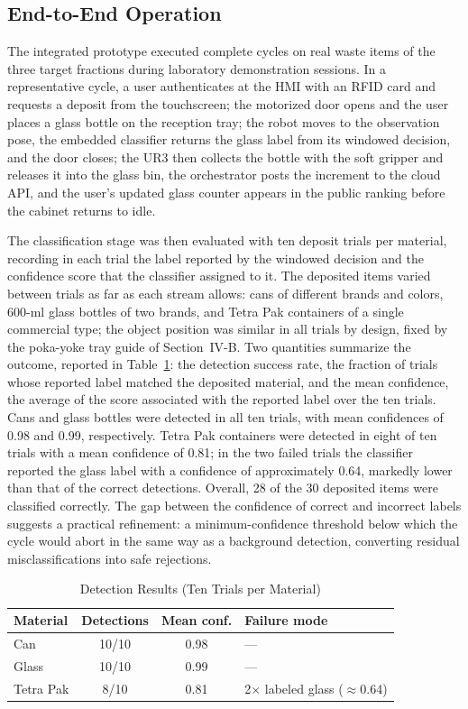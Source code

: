 \documentclass[conference]{IEEEtran}
\begin{document}
\subsection{End-to-End Operation}
The integrated prototype executed complete cycles on real waste items of the three target fractions during laboratory demonstration sessions. In a representative cycle, a user authenticates at the HMI with an RFID card and requests a deposit from the touchscreen; the motorized door opens and the user places a glass bottle on the reception tray; the robot moves to the observation pose, the embedded classifier returns the glass label from its windowed decision, and the door closes; the UR3 then collects the bottle with the soft gripper and releases it into the glass bin, the orchestrator posts the increment to the cloud API, and the user's updated glass counter appears in the public ranking before the cabinet returns to idle.

The classification stage was then evaluated with ten deposit trials per material, recording in each trial the label reported by the windowed decision and the confidence score that the classifier assigned to it. The deposited items varied between trials as far as each stream allows: cans of different brands and colors, 600-ml glass bottles of two brands, and Tetra Pak containers of a single commercial type; the object position was similar in all trials by design, fixed by the poka-yoke tray guide of Section~IV-B. Two quantities summarize the outcome, reported in Table~\ref{tab:results}: the detection success rate, the fraction of trials whose reported label matched the deposited material, and the mean confidence, the average of the score associated with the reported label over the ten trials. Cans and glass bottles were detected in all ten trials, with mean confidences of 0.98 and 0.99, respectively. Tetra Pak containers were detected in eight of ten trials with a mean confidence of 0.81; in the two failed trials the classifier reported the glass label with a confidence of approximately 0.64, markedly lower than that of the correct detections. Overall, 28 of the 30 deposited items were classified correctly. The gap between the confidence of correct and incorrect labels suggests a practical refinement: a minimum-confidence threshold below which the cycle would abort in the same way as a background detection, converting residual misclassifications into safe rejections.

\begin{table}[!t]
\caption{Detection Results (Ten Trials per Material)}
\begin{center}
\footnotesize
\begin{tabular}{|l|c|c|l|}
\hline
\textbf{Material} & \textbf{Detections} & \textbf{Mean conf.} & \textbf{Failure mode} \\
\hline
Can & 10/10 & 0.98 & --- \\
\hline
Glass & 10/10 & 0.99 & --- \\
\hline
Tetra Pak & 8/10 & 0.81 & 2$\times$ labeled glass ($\approx$0.64) \\
\hline
\end{tabular}
\label{tab:results}
\end{center}
\end{table}
\end{document}
